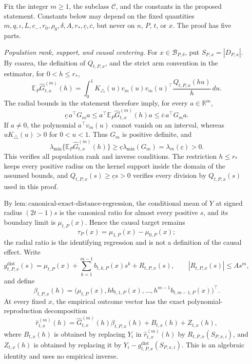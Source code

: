 Fix the integer \(m\geq1\), the subclass \(\mathcal C\), and the constants in the proposed statement.  Constants below may depend on the fixed quantities \(m,q,\iota,L,c_{-},r_0,\rho_0,\delta,A,r_*,\underline c,\overline c\), but never on \(n\), \(P\), \(t\), or \(x\).  The proof has five parts.

\emph{Population rank, support, and causal centering.}
For \(x\in\mathcal B_{P,\delta}\), put \(S_{P,x}=|D_{P,x}|\).  By coarea, the definition of \(Q_{t,P,x}\), and the strict arm convention in the estimator, for \(0<h\leq r_*\),
\[
 \mathbb E_P\widehat G^{(m)}_{t,x}(h)
 =\int_0^1K_\triangle(u)v_m(u)v_m(u)^\top
 \frac{Q_{t,P,x}(hu)}h\,du.
\]
The radial bounds in the statement therefore imply, for every \(a\in\mathbb R^m\),
\[
 \underline c\,a^\top G_ma
 \leq a^\top\mathbb E_P\widehat G^{(m)}_{t,x}(h)a
 \leq\overline c\,a^\top G_ma.
\]
If \(a\neq0\), the polynomial \(a^\top v_m(u)\) cannot vanish on an interval, whereas \(uK_\triangle(u)>0\) for \(0<u<1\).  Thus \(G_m\) is positive definite, and
\[
 \lambda_{\min}\{\mathbb E_P\widehat G^{(m)}_{t,x}(h)\}
 \geq\underline c\lambda_{\min}(G_m)=\lambda_m(\underline c)>0.
\]
This verifies all population rank and inverse conditions.  The restriction \(h\leq r_*\) keeps every positive radius on the kernel support inside the domain of the assumed bounds, and \(Q_{t,P,x}(s)\geq\underline cs>0\) verifies every division by \(Q_{t,P,x}(s)\) used in this proof.

By \(\mathrm{lem:canonical\text{-}exact\text{-}distance\text{-}regression}\), the conditional mean of \(Y\) at signed radius \((2t-1)s\) is the canonical ratio for almost every positive \(s\), and its boundary limit is \(\mu_{t,P}(x)\).  Hence the causal target remains
\[
 \tau_P(x)=\mu_{1,P}(x)-\mu_{0,P}(x);
\]
the radial ratio is the identifying regression and is not a definition of the causal effect.  Write
\[
 g^{\mathrm{dist}}_{t,P,x}(s)
 =\mu_{t,P}(x)+\sum_{k=1}^{m-1}b_{t,k,P}(x)s^k+R_{t,P,x}(s),
 \qquad |R_{t,P,x}(s)|\leq As^m,
\]
and define
\[
 \beta_{t,P,x}(h)=
 \bigl(\mu_{t,P}(x),hb_{t,1,P}(x),\ldots,
 h^{m-1}b_{t,m-1,P}(x)\bigr)^\top.
\]
At every fixed \(x\), the empirical outcome vector has the exact polynomial-reproduction decomposition
\[
 \widehat r^{(m)}_{t,x}(h)
 =\widehat G^{(m)}_{t,x}(h)\beta_{t,P,x}(h)
 +B_{t,x}(h)+Z_{t,x}(h),
\]
where \(B_{t,x}(h)\) is obtained by replacing \(Y_i\) in \(\widehat r^{(m)}_{t,x}(h)\) by \(R_{t,P,x}(S_{P,x,i})\), and \(Z_{t,x}(h)\) is obtained by replacing it by
\(Y_i-g^{\mathrm{dist}}_{t,P,x}(S_{P,x,i})\).  This is an algebraic identity and uses no empirical inverse.

